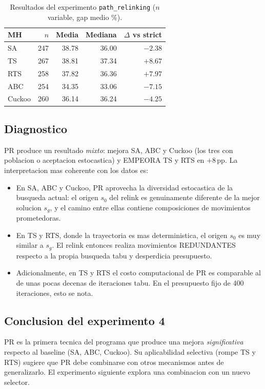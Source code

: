 \begin{table}[h]
\centering
\caption{Resultados del experimento \texttt{path\_relinking}
($n$ variable, gap medio \%).}
\label{tab:pr-resultados}
\small
\begin{tabular}{lrrrr}
\toprule
MH & $n$ & Media & Mediana & $\Delta$ vs strict \\
\midrule
SA      & 247 & 38.78 & 36.00 & $-2.38$ \\
TS      & 267 & 38.81 & 37.34 & $+8.67$ \\
RTS     & 258 & 37.82 & 36.36 & $+7.97$ \\
ABC     & 254 & 34.35 & 33.06 & $-7.15$ \\
Cuckoo  & 260 & 36.14 & 36.24 & $-4.25$ \\
\bottomrule
\end{tabular}
\end{table}

\subsection{Diagnostico}

PR produce un resultado \emph{mixto}: mejora SA, ABC y Cuckoo (los tres
con poblacion o aceptacion estocastica) y EMPEORA TS y RTS en
$+8\,$pp. La interpretacion mas coherente con los datos es:

\begin{itemize}
\item En SA, ABC y Cuckoo, PR aprovecha la diversidad estocastica de la
  busqueda actual: el origen $s_0$ del relink es genuinamente
  diferente de la mejor solucion $s_g$, y el camino entre ellas
  contiene composiciones de movimientos prometedoras.
\item En TS y RTS, donde la trayectoria es mas deterministica, el
  origen $s_0$ es muy similar a $s_g$. El relink entonces realiza
  movimientos REDUNDANTES respecto a la propia busqueda tabu y
  desperdicia presupuesto.
\item Adicionalmente, en TS y RTS el costo computacional de PR es
  comparable al de unas pocas decenas de iteraciones tabu. En el
  presupuesto fijo de 400 iteraciones, esto se nota.
\end{itemize}

\subsection{Conclusion del experimento 4}

PR es la primera tecnica del programa que produce una mejora
\emph{significativa} respecto al baseline (SA, ABC, Cuckoo). Su
aplicabilidad selectiva (rompe TS y RTS) sugiere que PR debe combinarse
con otros mecanismos antes de generalizarlo. El experimento siguiente
explora una combinacion con un nuevo selector.


